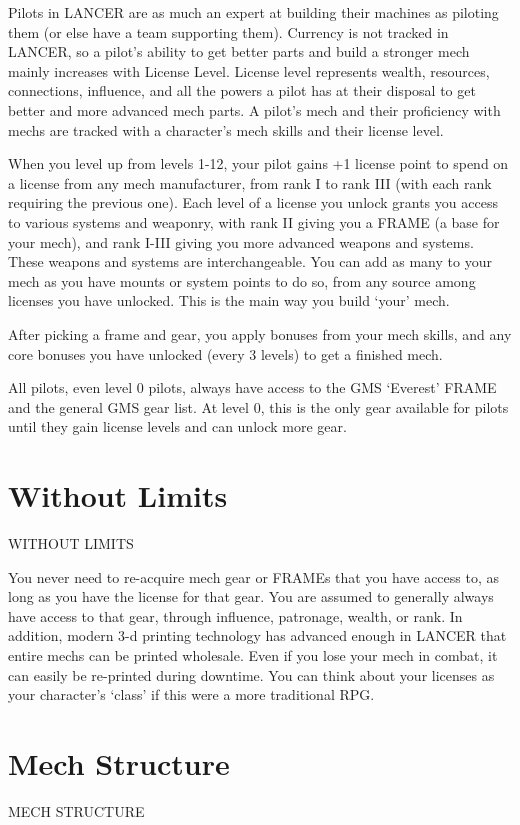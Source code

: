Pilots in LANCER are as much an expert at building their machines as piloting them (or else have
a team supporting them). Currency is not tracked in LANCER, so a pilot’s ability to get better parts
and build a stronger mech mainly increases with License Level. License level represents wealth,
resources, connections, influence, and all the powers a pilot has at their disposal to get better and
more advanced mech parts. A pilot’s mech and their proficiency with mechs are tracked with a
character’s mech skills and their license level.

When you level up from levels 1-12, your pilot gains +1 license point to spend on a license from
any mech manufacturer, from rank I to rank III (with each rank requiring the previous one). Each
level of a license you unlock grants you access to various systems and weaponry, with rank II
giving you a FRAME (a base for your mech), and rank I-III giving you more advanced weapons
and systems. These weapons and systems are interchangeable. You can add as many to your
mech as you have mounts or system points to do so, from any source among licenses you have
unlocked. This is the main way you build ‘your’ mech.


After picking a frame and gear, you apply bonuses from your mech skills, and any core
bonuses you have unlocked (every 3 levels) to get a finished mech.


All pilots, even level 0 pilots, always have access to the GMS ‘Everest’ FRAME and the general
GMS gear list. At level 0, this is the only gear available for pilots until they gain license levels and
can unlock more gear.

\section{Without Limits}
                                          WITHOUT LIMITS


You never need to re-acquire mech gear or FRAMEs that you have access to, as long as you
have the license for that gear. You are assumed to generally always have access to that gear,
through influence, patronage, wealth, or rank. In addition, modern 3-d printing technology has
advanced enough in LANCER that entire mechs can be printed wholesale. Even if you lose your
mech in combat, it can easily be re-printed during downtime. You can think about your licenses
as your character’s ‘class’ if this were a more traditional RPG.

\section{Mech Structure}
                                        MECH STRUCTURE




